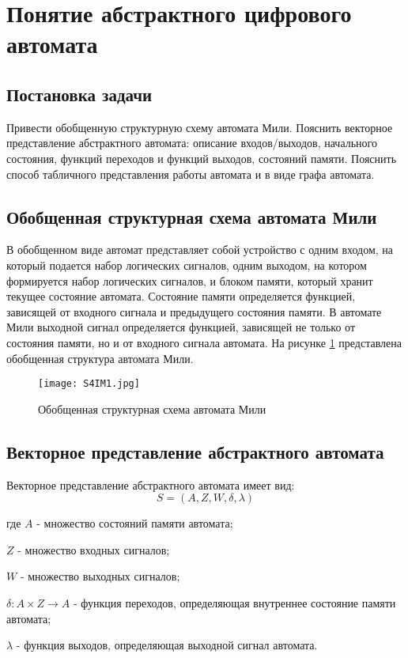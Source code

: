 \section{Понятие абстрактного цифрового автомата}

\subsection{Постановка задачи}

Привести обобщенную структурную схему автомата Мили.
Пояснить векторное представление абстрактного автомата:
описание входов/выходов, начального состояния, функций переходов и функций выходов, состояний памяти.
Пояснить способ табличного представления работы автомата и в виде графа автомата.

\subsection{Обобщенная структурная схема автомата Мили}

В обобщенном виде автомат представляет собой устройство с одним входом, на который подается набор логических сигналов, одним выходом,
на котором формируется набор логических сигналов, и блоком памяти, который хранит текущее состояние автомата.
Состояние памяти определяется функцией, зависящей от входного сигнала и предыдущего состояния памяти.
В автомате Мили выходной сигнал определяется функцией, зависящей не только от состояния памяти, но и от входного сигнала автомата.
На рисунке \ref{fig:task4:scheme} представлена обобщенная структура автомата Мили.

\begin{figure}[h!]
    \centering
    \texttt{[image: S4IM1.jpg]}
    \caption{Обобщенная структурная схема автомата Мили}
    \label{fig:task4:scheme}
\end{figure}

\subsection{Векторное представление абстрактного автомата}

Векторное представление абстрактного автомата имеет вид:
%
\begin{equation*}
    S = (A, Z, W, \delta, \lambda)
\end{equation*}

\begin{explanation}
    \item[где] $A$ - множество состояний памяти автомата;
    \item $Z$ - множество входных сигналов;
    \item $W$ - множество выходных сигналов;
    \item $\delta: A \times Z \rightarrow A$ - функция переходов, определяющая внутреннее состояние памяти автомата;
    \item $\lambda$ - функция выходов, определяющая выходной сигнал автомата.
\end{explanation}

